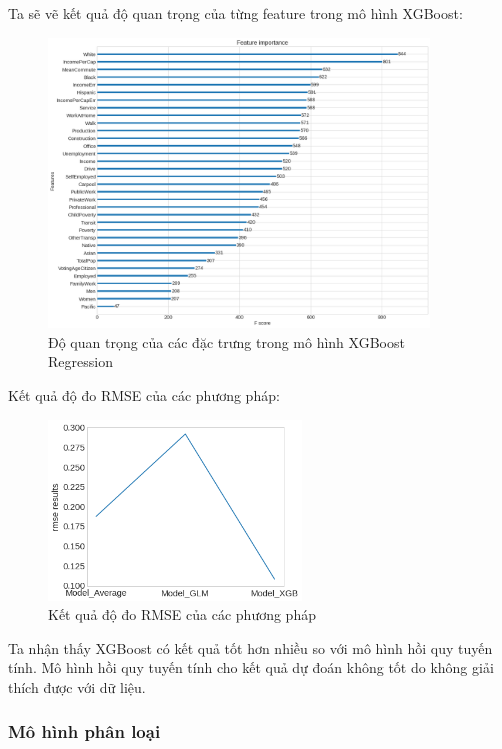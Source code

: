 \documentclass[14pt, a4paper]{article}
\numberwithin{equation}{section}
\numberwithin{figure}{section}
\numberwithin{dl}{section}
\numberwithin{md}{section}
\numberwithin{bd}{section}
\numberwithin{dn}{section}
\numberwithin{hq}{section}
\begin{document}
    Ta sẽ vẽ kết quả độ quan trọng của từng feature trong mô hình XGBoost:

    \begin{figure}[h!]
        \centering
        \includegraphics[width=0.9\textwidth]{figures/XGBoost_Regression_Feature_Importance.png}
        \caption{Độ quan trọng của các đặc trưng trong mô hình XGBoost Regression}
    \end{figure}
    
    Kết quả độ đo RMSE của các phương pháp:

    \begin{figure}[h!]
        \centering
        \includegraphics[width=0.6\textwidth]{figures/Regression_Model_Result_RMSE.png}
        \caption{Kết quả độ đo RMSE của các phương pháp}
    \end{figure}

    Ta nhận thấy XGBoost có kết quả tốt hơn nhiều so với mô hình hồi quy tuyến tính.
    Mô hình hồi quy tuyến tính cho kết quả dự đoán không tốt do không giải thích được với dữ liệu.

    \subsubsection{Mô hình phân loại}
\end{document}
